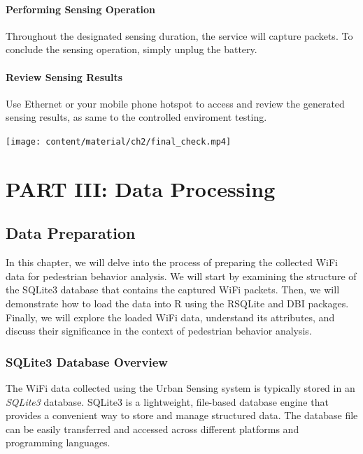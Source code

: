 \documentclass[
  letterpaper,
]{scrbook}
\begin{document}
\hypertarget{performing-sensing-operation}{%
\subsection{Performing Sensing
Operation}\label{performing-sensing-operation}}

Throughout the designated sensing duration, the service will capture
packets. To conclude the sensing operation, simply unplug the battery.

\hypertarget{review-sensing-results}{%
\subsection{Review Sensing Results}\label{review-sensing-results}}

Use Ethernet or your mobile phone hotspot to access and review the
generated sensing results, as same to the controlled enviroment testing.

\texttt{[image: content/material/ch2/final\_check.mp4]}

\part{PART III: Data Processing}

\hypertarget{data-preparation}{%
\chapter{Data Preparation}\label{data-preparation}}

In this chapter, we will delve into the process of preparing the
collected WiFi data for pedestrian behavior analysis. We will start by
examining the structure of the SQLite3 database that contains the
captured WiFi packets. Then, we will demonstrate how to load the data
into R using the RSQLite and DBI packages. Finally, we will explore the
loaded WiFi data, understand its attributes, and discuss their
significance in the context of pedestrian behavior analysis.

\hypertarget{sqlite3-database-overview}{%
\section{SQLite3 Database Overview}\label{sqlite3-database-overview}}

The WiFi data collected using the Urban Sensing system is typically
stored in an \emph{SQLite3} database. SQLite3 is a lightweight,
file-based database engine that provides a convenient way to store and
manage structured data. The database file can be easily transferred and
accessed across different platforms and programming languages.
\end{document}
